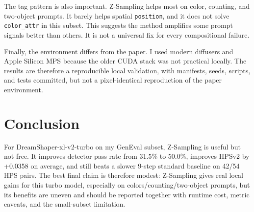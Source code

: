 The tag pattern is also important. Z-Sampling helps most on color, counting, and two-object prompts. It barely helps spatial \texttt{position}, and it does not solve \texttt{color\_attr} in this subset. This suggests the method amplifies some prompt signals better than others. It is not a universal fix for every compositional failure.

Finally, the environment differs from the paper. I used modern diffusers and Apple Silicon MPS because the older CUDA stack was not practical locally. The results are therefore a reproducible local validation, with manifests, seeds, scripts, and tests committed, but not a pixel-identical reproduction of the paper environment.

\section{Conclusion}

For DreamShaper-xl-v2-turbo on my GenEval subset, Z-Sampling is useful but not free. It improves detector pass rate from 31.5\% to 50.0\%, improves HPSv2 by +0.0358 on average, and still beats a slower 9-step standard baseline on 42/54 HPS pairs. The best final claim is therefore modest: Z-Sampling gives real local gains for this turbo model, especially on colors/counting/two-object prompts, but its benefits are uneven and should be reported together with runtime cost, metric caveats, and the small-subset limitation.
